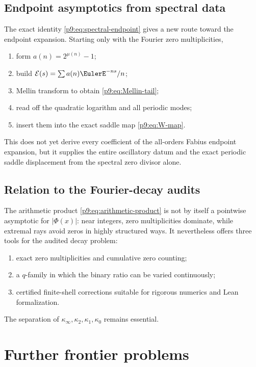 \documentclass[11pt]{article}
\numberwithin{equation}{section}
\theoremstyle{definition}
\theoremstyle{remark}
\begin{document}
\subsection{Endpoint asymptotics from spectral data}
The exact identity \eqref{p9:eq:spectral-endpoint} gives a new route toward the endpoint
expansion.  Starting only with the Fourier zero multiplicities,
\begin{enumerate}
\item form $a(n)=2^{\mu(n)}-1$;
\item build $\mathcal E(s)=\sum a(n)\EulerE^{-ns}/n$;
\item Mellin transform to obtain \eqref{p9:eq:Mellin-tail};
\item read off the quadratic logarithm and all periodic modes;
\item insert them into the exact saddle map \eqref{p9:eq:W-map}.
\end{enumerate}
This does not yet derive every coefficient of the all-orders Fabius endpoint expansion,
but it supplies the entire oscillatory datum and the exact periodic saddle displacement
from the spectral zero divisor alone.

\subsection{Relation to the Fourier-decay audits}
The arithmetic product \eqref{p9:eq:arithmetic-product} is not by itself a pointwise asymptotic
for $|\Phi(x)|$: near integers, zero multiplicities dominate, while extremal rays avoid
zeros in highly structured ways.  It nevertheless offers three tools for the audited
decay problem:
\begin{enumerate}
\item exact zero multiplicities and cumulative zero counting;
\item a $q$-family in which the binary ratio can be varied continuously;
\item certified finite-shell corrections suitable for rigorous numerics and Lean
formalization.
\end{enumerate}
The separation of $\kappa_\infty,\kappa_2,\kappa_1,\kappa_0$ remains essential.

\section{Further frontier problems}
\label{p9:sec:frontiers}
\end{document}
